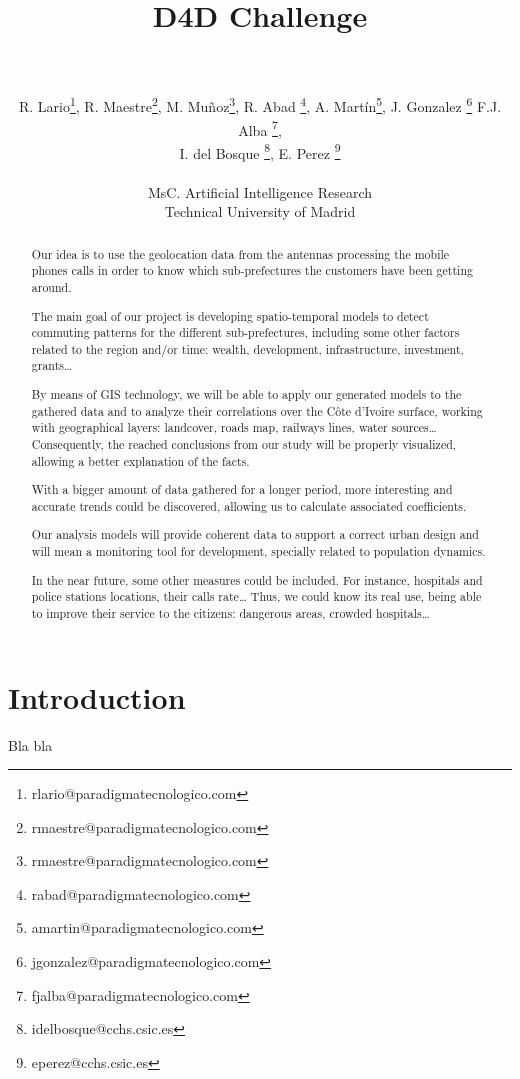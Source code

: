 \documentclass[a4paper,11pt]{article}
\begin{document}
\title{{\huge D4D Challenge} \\  \\ }

\author{{
				R. Lario\footnote{rlario@paradigmatecnologico.com}, 
				R. Maestre\footnote{rmaestre@paradigmatecnologico.com}, 
				M. Muñoz\footnote{rmaestre@paradigmatecnologico.com}, 
				R. Abad \footnote{rabad@paradigmatecnologico.com}, 
				A. Martín\footnote{amartin@paradigmatecnologico.com}, 
				J. Gonzalez \footnote{jgonzalez@paradigmatecnologico.com}
				F.J. Alba \footnote{fjalba@paradigmatecnologico.com}, \\
				I. del Bosque \footnote{idelbosque@cchs.csic.es}, 
				E. Perez \footnote{eperez@cchs.csic.es}
				}\\ \\
{\small MsC. Artificial Intelligence Research \\Technical University of Madrid}}

\date{}
\maketitle

\begin{abstract} 
Our idea is to use the geolocation data from the antennas processing the mobile phones calls in order to know which sub-prefectures the customers have been getting around.

The main goal of our project is developing spatio-temporal models to detect commuting patterns for the different sub-prefectures, including some other factors related to the region and/or time: wealth, development, infrastructure, investment, grants…

By means of GIS technology, we will be able to apply our generated models to the gathered data and to analyze their correlations over the Côte d’Ivoire surface, working with geographical layers: landcover, roads map, railways lines, water sources… Consequently, the reached conclusions from our study will be properly visualized, allowing a better explanation of the facts.

With a bigger amount of data gathered for a longer period, more interesting and accurate trends could be discovered, allowing us to calculate associated coefficients.

Our analysis models will provide coherent data to support a correct urban design and will mean a monitoring tool for development, specially related to population dynamics.

In the near future, some other measures could be included. For instance, hospitals and police stations locations, their calls rate… Thus, we could know its real use, being able to improve their service to the citizens: dangerous areas, crowded hospitals…
\end{abstract}

\newpage
\setcounter{secnumdepth}{0}
\section{Introduction}

Bla bla



%

\end{document}
